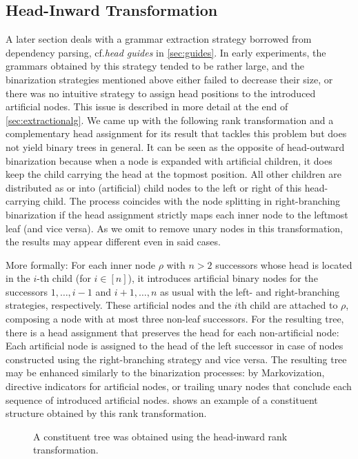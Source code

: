 \documentclass[../../document.tex]{subfiles}
\begin{document}
    \subsection{Head-Inward Transformation} \label{sec:extraction:bin:hi}
    A later section deals with a grammar extraction strategy borrowed from dependency parsing, cf.\@ \emph{head guides} in \cref{sec:guides}.
    In early experiments, the grammars obtained by this strategy tended to be rather large, and the binarization strategies mentioned above either failed to decrease their size, or there was no intuitive strategy to assign head positions to the introduced artificial nodes.
    This issue is described in more detail at the end of \cref{sec:extractionalg}.
    We came up with the following rank transformation and a complementary head assignment for its result that tackles this problem but does not yield binary trees in general.
    It can be seen as the opposite of head-outward binarization because when a node is expanded with artificial children, it does keep the child carrying the head at the topmost position.
    All other children are distributed as or into (artificial) child nodes to the left or right of this head-carrying child.
    The process coincides with the node splitting in right-branching binarization if the head assignment strictly maps each inner node to the leftmost leaf (and vice versa).
    As we omit to remove unary nodes in this transformation, the results may appear different even in said cases.

    More formally: For each inner node \(\rho\) with \(n > 2\) successors whose head is located in the \(i\)-th child (for \(i \in [n]\)), it introduces artificial binary nodes for the successors \(1, \ldots, i-1\) and \(i+1, \ldots, n\) as usual with the left- and right-branching strategies, respectively.
    These artificial nodes and the \(i\)th child are attached to \(\rho\), composing a node with at most three non-leaf successors.
    For the resulting tree, there is a head assignment that preserves the head for each non-artificial node:
        Each artificial node is assigned to the head of the left successor in case of nodes constructed using the right-branching strategy and vice versa.
    The resulting tree may be enhanced similarly to the binarization processes: by Markovization, directive indicators for artificial nodes, or trailing unary nodes that conclude each sequence of introduced artificial nodes.
     shows an example of a constituent structure obtained by this rank transformation.

    \begin{figure}
        \centering
        
        \caption{\label{fig:ex:head-inward}
            A constituent tree was obtained using the head-inward rank transformation.
        }
    \end{figure}
\end{document}
